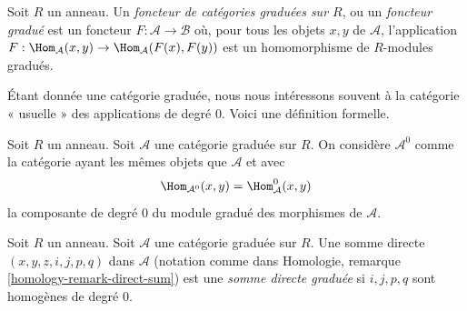 \begin{definition}
\label{definition-functor-graded-categories}
Soit $R$ un anneau. Un {\it foncteur de catégories graduées sur $R$}, ou un
{\it foncteur gradué}
est un foncteur $F : \mathcal{A} \to \mathcal{B}$ où, pour tous les objets
$x, y$ de $\mathcal{A}$,
l'application $F : \Hom_\mathcal{A}(x, y) \to \Hom_\mathcal{A}(F(x), F(y))$ est
un homomorphisme de $R$-modules gradués.
\end{definition}

\noindent
Étant donnée une catégorie graduée, nous nous intéressons
souvent à la catégorie « usuelle » des applications de degré $0$.
Voici une définition formelle.

\begin{definition}
\label{definition-H0-of-graded-category}
Soit $R$ un anneau. Soit $\mathcal{A}$ une catégorie graduée
sur $R$. On considère {\it $\mathcal{A}^0$} comme la catégorie ayant
les mêmes objets que $\mathcal{A}$ et avec
$$
\Hom_{\mathcal{A}^0}(x, y) = \Hom^0_\mathcal{A}(x, y)
$$
la composante de degré $0$ du module gradué des morphismes de
$\mathcal{A}$.
\end{definition}

\begin{definition}
\label{definition-graded-direct-sum}
Soit $R$ un anneau. Soit $\mathcal{A}$ une catégorie graduée sur $R$. Une
somme directe $(x, y, z, i, j, p, q)$ dans $\mathcal{A}$ (notation comme
dans Homologie, remarque \ref{homology-remark-direct-sum})
est une {\it somme directe graduée} si $i, j, p, q$ sont homogènes
de degré $0$.
\end{definition}

